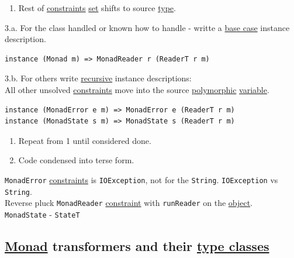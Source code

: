 \documentclass[11pt]{article}
\begin{document}
\begin{enumerate}
\item Rest of \hyperref[orgcddf7a9]{constraints} \hyperref[org1faf06d]{set} shifts to source \hyperref[orgc4aea2f]{type}.\\
\end{enumerate}

3.a. For the class handled or known how to handle - writte a \hyperref[org5e6db3a]{base case} instance description.\\

\begin{verbatim}
instance (Monad m) => MonadReader r (ReaderT r m)
\end{verbatim}

3.b. For others write \hyperref[orgf513e66]{recursive} instance descriptions:\\

All other unsolved \hyperref[orgcddf7a9]{constraints} move into the source \hyperref[orgac4d581]{polymorphic} \hyperref[org0b57594]{variable}.\\

\begin{verbatim}
instance (MonadError e m) => MonadError e (ReaderT r m)
instance (MonadState s m) => MonadState s (ReaderT r m)
\end{verbatim}

\begin{enumerate}
\item Repeat from 1 until considered done.\\

\item Code condensed into terse form.\\
\end{enumerate}

\texttt{MonadError} \hyperref[orgcddf7a9]{constraints} is \texttt{IOException}, not for the \texttt{String}. \texttt{IOException} vs \texttt{String}.\\

Reverse pluck \texttt{MonadReader} \hyperref[org180980d]{constraint} with \texttt{runReader} on the \hyperref[org4be0e9d]{object}.\\

\texttt{MonadState} - \texttt{StateT}\\

\subsection{\hyperref[org86a5d95]{Monad} transformers and their \hyperref[orgead20df]{type classes}}
\label{sec:orgb2c7ac5}
\end{document}
